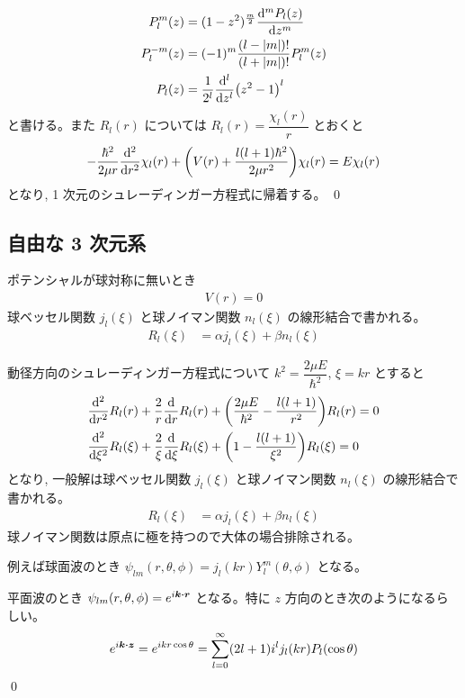 \documentclass[uplatex,dvipdfmx,a4paper,11pt]{jlreq}
\makeatletter
\numberwithin{equation}{section}
\theoremstyle{definition}
\renewenvironment{proof}[1][\proofname]{\par
  \normalfont
  \topsep6\p@\@plus6\p@ \trivlist
  \item[\hskip\labelsep{\bfseries #1}\@addpunct{\bfseries}]\ignorespaces\quad\par
}{%
  \qed\endtrivlist\@endpefalse
}
\renewcommand\proofname{証明}
\makeatother
\begin{document}
\begin{proof}
\begin{align}
    P_l^m(z)            & = (1 - z^2)^{\frac{m}{2}}\dv[m]{P_l(z)}{z}                                                               \\
    P_l^{-m}(z)         & = (-1)^m\frac{(l - |m|)!}{(l + |m|)!}P_l^m(z)                                                            \\
    P_l(z)              & = \frac{1}{2^l}\dv[l]{z}(z^2 - 1)^l
  \end{align}
  と書ける。また $R_l(r)$ については $R_l(r) = \dfrac{\chi_l(r)}{r}$ とおくと
  \begin{align}
    - \frac{\hbar^2}{2\mu r}\dv[2]{r}\chi_l(r) + \qty(V(r) + \frac{l(l+1)\hbar^2}{2\mu r^2})\chi_l(r) = E\chi_l(r)
  \end{align}
  となり, 1 次元のシュレーディンガー方程式に帰着する。
\end{proof}



\subsection{自由な 3 次元系}
\begin{proposition}
  ポテンシャルが球対称に無いとき
  \begin{align}
    V(r) = 0
  \end{align}
  球ベッセル関数 $j_l(\xi)$ と球ノイマン関数 $n_l(\xi)$ の線形結合で書かれる。
  \begin{align}
    R_l(\xi) & = \alpha j_l(\xi) + \beta n_l(\xi)
  \end{align}
\end{proposition}
\begin{proof}
  動径方向のシュレーディンガー方程式について $k^2 = \dfrac{2\mu E}{\hbar^2}$, $\xi = kr$ とすると
  \begin{align}
     & \dv[2]{r}R_l(r) + \frac{2}{r}\dv{r}R_l(r) + \qty(\frac{2\mu E}{\hbar^2} - \frac{l(l+1)}{r^2})R_l(r) = 0 \\
     & \dv[2]{\xi}R_l(\xi) + \frac{2}{\xi}\dv{\xi}R_l(\xi) + \qty(1 - \frac{l(l+1)}{\xi^2})R_l(\xi) = 0
  \end{align}
  となり, 一般解は球ベッセル関数 $j_l(\xi)$ と球ノイマン関数 $n_l(\xi)$ の線形結合で書かれる。
  \begin{align}
    R_l(\xi) & = \alpha j_l(\xi) + \beta n_l(\xi)
  \end{align}
  球ノイマン関数は原点に極を持つので大体の場合排除される。

  例えば球面波のとき $\psi_{lm}(r, \theta, \phi) = j_l(kr)Y_l^m(\theta,\phi)$ となる。

  平面波のとき $\psi_{lm}(r, \theta, \phi) = e^{i\bm{k}\vdot\bm{r}}$ となる。特に $z$ 方向のとき次のようになるらしい。
  \begin{align}
    e^{i\bm{k}\vdot\bm{z}} = e^{ikr\cos\theta} = \sum_{l = 0}^\infty (2l + 1)i^lj_l(kr)P_l(\cos\theta)
  \end{align}
\end{proof}
\end{document}
